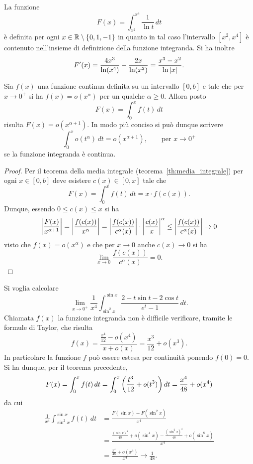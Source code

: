 \begin{example}
La funzione
\[
 F(x) = \int_{x^2}^{x^4} \frac{1}{\ln t}\, dt
\]
è definita per ogni $x\in \mathbb R\setminus{\left\{ 0,1,-1 \right\}}$ 
in quanto in tal caso l'intervallo
$[x^2,x^4]$ è contenuto nell'insieme di definizione
della funzione integranda.
Si ha inoltre
\[
F'(x)
= \frac{4x^3}{\ln (x^4)} - \frac{2x}{\ln (x^2)}
= \frac{x^3-x^2}{\ln {\left|x\right|}}.
\]
\end{example}

\begin{theorem}
Sia $f(x)$ una funzione continua definita
su un intervallo $[0,b]$ e tale che
per $x\to 0^+$ si ha
$f(x) = o(x^\alpha)$ per un qualche $\alpha\ge 0$.
Allora posto
\[
  F(x) = \int_0^x f(t)\, dt
\]
risulta $F(x) = o(x^{\alpha+1})$.
In modo più conciso si può dunque scrivere
\[
  \int_0^x o(t^\alpha)\, dt = o (x^{\alpha+1}),
  \qquad \text{per $x\to 0^+$}
\]
se la funzione integranda è continua.
\end{theorem}
%
\begin{proof}
Per il teorema della media integrale (teorema~\ref{th:media_integrale})
per ogni $x\in [0,b]$ deve esistere $c(x)\in[0,x]$ tale che
\[
  F(x)
  = \int_0^x f(t)\, dt
  = x \cdot f(c(x)).
\]
Dunque, essendo $0\le c(x)\le x$ si ha
\[
{\left|\frac{F(x)}{x^{\alpha+1}}\right|}
= {\left|\frac{f(c(x))}{x^\alpha}\right|}
= {\left|\frac{f(c(x))}{c^\alpha(x)}\right|}
\cdot {\left|\frac{c(x)}{x}\right|}^\alpha
\le {\left|\frac{f(c(x))}{c^\alpha(x)}\right|} \to 0
\]
visto che $f(x) = o(x^\alpha)$
e che per $x\to 0$ anche $c(x)\to 0$
si ha
\[
  \lim_{x\to 0} \frac{f(c(x))}{c^\alpha(x)} = 0.
\]
\end{proof}

\begin{example}
Si voglia calcolare
\[
  \lim_{x\to 0^+} \frac{1}{x^4}\int_{\sin^2 x}^{\sin x} \frac{2- t\sin t - 2 \cos t}{e^t - 1}\, dt.
\]
Chiamata $f(x)$ la funzione integranda non è difficile
verificare, tramite le formule di Taylor, che risulta
\[
  f(x)
  = \frac{\frac{x^4}{12}-o(x^4)}{x+o(x)}
  = \frac{x^3}{12} + o(x^3).
\]
In particolare la funzione $f$ può essere estesa per
continuità ponendo $f(0)=0$.
Si ha dunque, per il teorema precedente,
\[
  F(x) = \int_0^x f(t)\, dt
  = \int_0^x {\left( \frac{t^3}{12}+o(t^3) \right)}\, dt
  = \frac{x^4}{48} + o(x^4)
\]
da cui
\begin{align*}
 \frac{1}{x^4} \int_{\sin^2 x}^{\sin x}
 f(t) \, dt
 &= \frac{F(\sin x) - F(\sin^2 x)}{x^4}\\
 &= \frac{\frac{(\sin x)^4}{48} + o(\sin^4 x) - \frac{(\sin^2 x)^4}{48} + o(\sin^8 x)}{x^4} \\
 &= \frac{\frac{x^4}{48} + o(x^4)}{x^4} \to \frac{1}{48}.
\end{align*}
\end{example}

